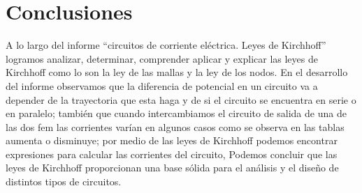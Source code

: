 \documentclass[letterpaper, 12pt]{article}
\begin{document}
\section{Conclusiones}

A lo largo del informe “circuitos de corriente eléctrica.
Leyes de Kirchhoff” logramos analizar, determinar,
comprender aplicar y explicar las leyes de Kirchhoff como
lo son la ley de las mallas y la ley de los nodos. En el
desarrollo del informe observamos que la diferencia de
potencial en un circuito va a depender de la trayectoria
que esta haga y de si el circuito se encuentra en serie o
en paralelo; también que cuando intercambiamos el circuito
de salida de una de las dos fem las corrientes varían en
algunos casos como se observa en las tablas aumenta o
disminuye; por medio de las leyes de Kirchhoff podemos
encontrar expresiones para calcular las corrientes del
circuito, Podemos concluir que las leyes de Kirchhoff
proporcionan una base sólida para el análisis y el diseño
de distintos tipos de circuitos.

\printbibliography
\end{document}
